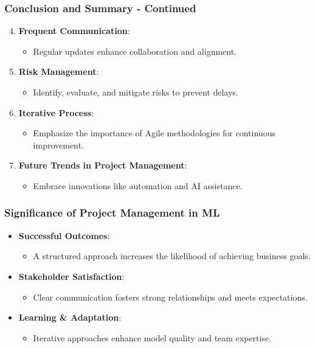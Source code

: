 \documentclass[aspectratio=169]{beamer}
\begin{document}
\begin{frame}[fragile]
    \frametitle{Conclusion and Summary - Continued}
    \begin{enumerate}
        \setcounter{enumi}{3} %
        \item \textbf{Frequent Communication}:
        \begin{itemize}
            \item Regular updates enhance collaboration and alignment.
        \end{itemize}

        \item \textbf{Risk Management}:
        \begin{itemize}
            \item Identify, evaluate, and mitigate risks to prevent delays.
        \end{itemize}

        \item \textbf{Iterative Process}:
        \begin{itemize}
            \item Emphasize the importance of Agile methodologies for continuous improvement.
        \end{itemize}

        \item \textbf{Future Trends in Project Management}:
        \begin{itemize}
            \item Embrace innovations like automation and AI assistance.
        \end{itemize}
    \end{enumerate}
\end{frame}

\begin{frame}[fragile]
    \frametitle{Significance of Project Management in ML}
    \begin{itemize}
        \item \textbf{Successful Outcomes}:
        \begin{itemize}
            \item A structured approach increases the likelihood of achieving business goals.
        \end{itemize}

        \item \textbf{Stakeholder Satisfaction}:
        \begin{itemize}
            \item Clear communication fosters strong relationships and meets expectations.
        \end{itemize}

        \item \textbf{Learning \& Adaptation}:
        \begin{itemize}
            \item Iterative approaches enhance model quality and team expertise.
        \end{itemize}
    \end{itemize}
\end{frame}
\end{document}
